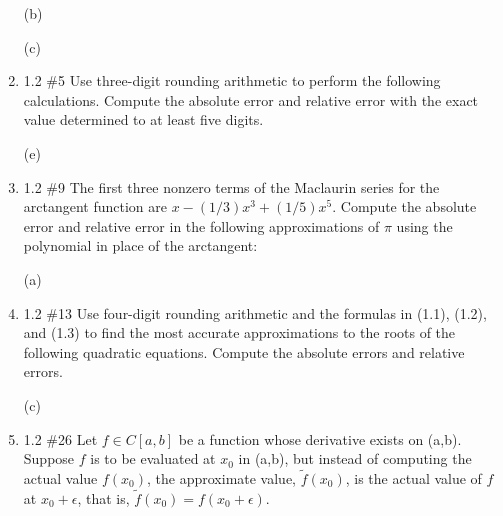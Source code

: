 \documentclass[12pt]{article}
\begin{document}
\begin{enumerate}
    (b)

    (c)

    \item 1.2 \#5 Use three-digit rounding arithmetic to perform the following calculations. Compute the absolute error and relative error with the exact value determined to at least five digits.

    (e)

    \item 1.2 \#9 The first three nonzero terms of the Maclaurin series for the arctangent function are ${x-(1/3)x^3+(1/5)x^5}$. Compute the absolute error and relative error in the following approximations of ${\pi}$ using the polynomial in place of the arctangent:

    (a)

    \item 1.2 \#13 Use four-digit rounding arithmetic and the formulas in (1.1), (1.2), and (1.3) to find the most accurate approximations to the roots of the following quadratic equations. Compute the absolute errors and relative errors.

    (c)

    \item 1.2 \#26 Let ${f \in C[a,b]}$ be a function whose derivative exists on (a,b). Suppose ${f}$ is to be evaluated at ${x_0}$ in (a,b), but instead of computing the actual value ${f(x_0)}$, the approximate value, ${\tilde{f}(x_0)}$, is the actual value of ${f}$ at ${x_0+\epsilon}$, that is, ${\tilde{f}(x_0)=f(x_0+\epsilon)}$.

\end{enumerate}
\end{document}
